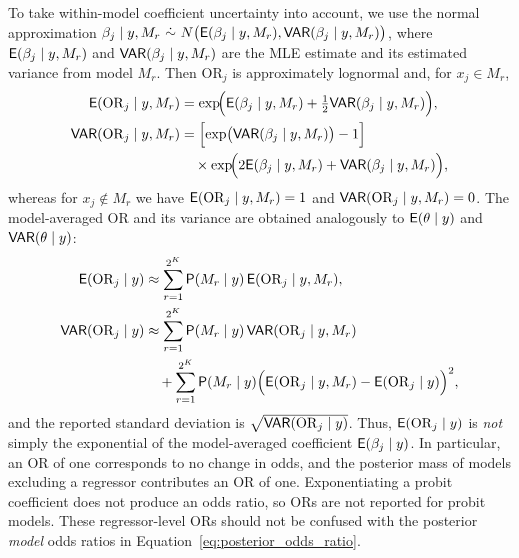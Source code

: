 To take within-model coefficient uncertainty into account, we use the normal
approximation $\beta_j\mid y,M_r\ \dot{\sim}\ N\bigl(\E(\beta_j\mid y,M_r),\VAR(\beta_j\mid y,M_r)\bigr)$,
where $\mathsf{E}(\beta_j\mid y,M_r)$ and $\mathsf{VAR}(\beta_j\mid y,M_r)$ are the
MLE estimate and its estimated variance from model $M_r$. Then
$\mathrm{OR}_j$ is approximately lognormal and, for $x_j\in M_r$,
\begin{align}
	\mathsf{E}(\mathrm{OR}_j\mid y,M_r)&=\exp\!\Bigl(\mathsf{E}(\beta_j\mid y,M_r)+\tfrac12 \mathsf{VAR}(\beta_j\mid y,M_r)\Bigr),
	\label{eq:bace_or_moment1}\\
	\mathsf{VAR}(\mathrm{OR}_j\mid y,M_r)&=\Bigl[\exp\bigl(\mathsf{VAR}(\beta_j\mid y,M_r)\bigr)-1\Bigr]\nonumber\\
	&\quad\times\exp\!\Bigl(2\mathsf{E}(\beta_j\mid y,M_r)+\mathsf{VAR}(\beta_j\mid y,M_r)\Bigr),
	\label{eq:bace_or_moment2}
\end{align}
whereas for $x_j\notin M_r$ we have $\mathsf{E}(\mathrm{OR}_j\mid y,M_r)=1$ and
$\mathsf{VAR}(\mathrm{OR}_j\mid y,M_r)=0$. The model-averaged OR and its variance
are obtained analogously to $\mathsf{E}(\theta\mid y)$ and $\mathsf{VAR}(\theta\mid y)$:
\begin{align}
	\mathsf{E}(\mathrm{OR}_j\mid y)&\approx\sum_{r=1}^{2^K}\mathsf{P}(M_r\mid y)\,\mathsf{E}(\mathrm{OR}_j\mid y,M_r),\\
	\mathsf{VAR}(\mathrm{OR}_j\mid y)&\approx\sum_{r=1}^{2^K}\mathsf{P}(M_r\mid y)\,\mathsf{VAR}(\mathrm{OR}_j\mid y,M_r)\nonumber\\
	&\quad+\sum_{r=1}^{2^K}\mathsf{P}(M_r\mid y)\Bigl(\mathsf{E}(\mathrm{OR}_j\mid y,M_r)-\mathsf{E}(\mathrm{OR}_j\mid y)\Bigr)^2,
	\label{eq:bace_or_bma}
\end{align}
and the reported standard deviation is $\sqrt{\mathsf{VAR}(\mathrm{OR}_j\mid y)}$.
Thus, $\mathsf{E}(\mathrm{OR}_j\mid y)$ is \emph{not} simply the exponential of
the model-averaged coefficient $\mathsf{E}(\beta_j\mid y)$. In particular, an OR of one
corresponds to no change in odds, and the posterior mass of models
excluding a regressor contributes an OR of one. Exponentiating a
probit coefficient does not produce an odds ratio, so ORs are not
reported for probit models. These regressor-level ORs should not be
confused with the posterior \emph{model} odds ratios in
Equation~\ref{eq:posterior_odds_ratio}.


